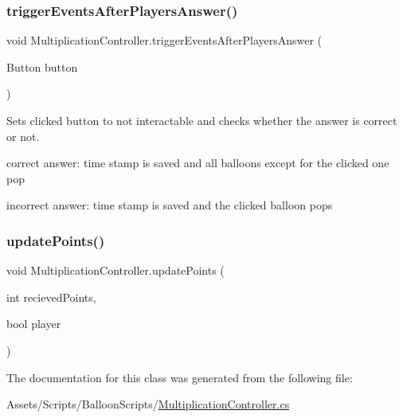 \subsubsection{\texorpdfstring{trigger\+Events\+After\+Players\+Answer()}{triggerEventsAfterPlayersAnswer()}}
{\footnotesize\ttfamily void Multiplication\+Controller.\+trigger\+Events\+After\+Players\+Answer (\begin{DoxyParamCaption}\item[{Button}]{button }\end{DoxyParamCaption})\hspace{0.3cm}{\ttfamily [inline]}}



Sets clicked button to not interactable and checks whether the answer is correct or not. 

correct answer\+: time stamp is saved and all balloons except for the clicked one pop 

incorrect answer\+: time stamp is saved and the clicked balloon pops \mbox{\label{classMultiplicationController_a521da5ae3ea1be50eaea06d7000954c8}} 
\subsubsection{\texorpdfstring{update\+Points()}{updatePoints()}}
{\footnotesize\ttfamily void Multiplication\+Controller.\+update\+Points (\begin{DoxyParamCaption}\item[{int}]{recieved\+Points,  }\item[{bool}]{player }\end{DoxyParamCaption})\hspace{0.3cm}{\ttfamily [inline]}}



The documentation for this class was generated from the following file\+:\begin{DoxyCompactItemize}
\item 
Assets/\+Scripts/\+Balloon\+Scripts/\hyperlink{MultiplicationController_8cs}{Multiplication\+Controller.\+cs}\end{DoxyCompactItemize}
